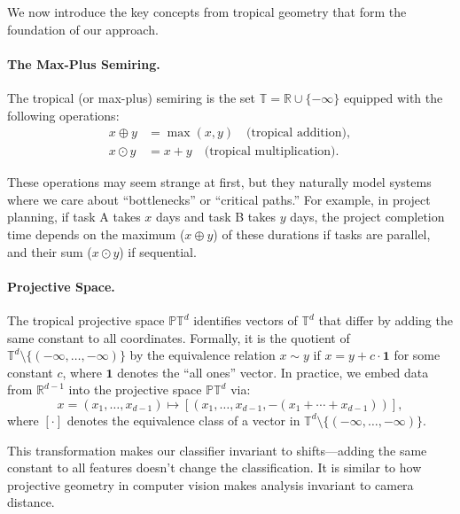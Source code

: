 \documentclass{article}
\newcommand{\R}{\mathbb{R}}
\newcommand{\trop}{\mathbb{T}}
\newcommand{\proj}{\mathbb{P}}
\begin{document}
We now introduce the key concepts from tropical geometry that form the foundation of our approach.

\paragraph{The Max-Plus Semiring.}
The tropical (or max-plus) semiring is the set $\trop = \R \cup \{-\infty\}$
equipped with the following operations:
\begin{align}
x \oplus y &= \max(x,y) \quad \text{(tropical addition)}, \\
x \odot y &= x + y \quad \text{(tropical multiplication)}.
\end{align}

These operations may seem strange at first, but they naturally model systems where we care about ``bottlenecks'' or ``critical paths.'' For example, in project planning, if task A takes $x$ days and task B takes $y$ days, the project completion time depends on the maximum ($x \oplus y$) of these durations if tasks are parallel, and their sum ($x \odot y$) if sequential.


\paragraph{Projective Space.}  
The tropical projective space $\proj \trop^d$ identifies vectors of $\trop^d$ that differ by adding the same constant to all coordinates. Formally, it is the quotient of $\trop^d \setminus \{(-\infty,\dots,-\infty)\}$ by the equivalence relation $x \sim y$ if $x = y + c \cdot \mathbf{1}$ for some constant $c$, where $\mathbf{1}$ denotes the ``all ones'' vector. In practice, we embed data from $\R^{d-1}$ into the projective space $\proj \trop^d$ via:
\[
x=(x_1,\dots,x_{d-1})\mapsto [(x_1,\dots,x_{d-1},-(x_1+\cdots+x_{d-1}))],
\]
where $[\cdot]$ denotes the equivalence class of a vector in  $\trop^d \setminus \{(-\infty,\dots,-\infty)\}$.

This transformation makes our classifier invariant to shifts—adding the same constant to all features doesn't change the classification. It is similar to how projective geometry in computer vision makes analysis invariant to camera distance.
\end{document}
